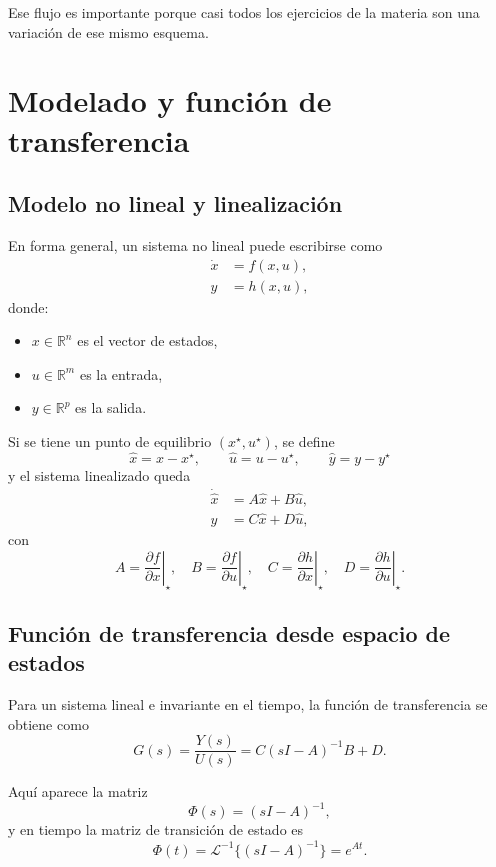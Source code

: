 \documentclass[11pt]{article}
\begin{document}
Ese flujo es importante porque casi todos los ejercicios de la materia son una variaci\'on de ese mismo esquema.

\section{Modelado y funci\'on de transferencia}
\subsection{Modelo no lineal y linealizaci\'on}
En forma general, un sistema no lineal puede escribirse como
\begin{align}
\dot{x} &= f(x,u),\\
y &= h(x,u),
\end{align}
donde:
\begin{itemize}
\item $x \in \mathbb{R}^n$ es el vector de estados,
\item $u \in \mathbb{R}^m$ es la entrada,
\item $y \in \mathbb{R}^p$ es la salida.
\end{itemize}

Si se tiene un punto de equilibrio $(x^\star,u^\star)$, se define
\[
\hat{x}=x-x^\star,\qquad \hat{u}=u-u^\star,\qquad \hat{y}=y-y^\star
\]
y el sistema linealizado queda
\begin{align}
\dot{\hat{x}} &= A\hat{x}+B\hat{u},\\
\hat{y} &= C\hat{x}+D\hat{u},
\end{align}
con
\[
A=\left.\frac{\partial f}{\partial x}\right|_\star,\quad
B=\left.\frac{\partial f}{\partial u}\right|_\star,\quad
C=\left.\frac{\partial h}{\partial x}\right|_\star,\quad
D=\left.\frac{\partial h}{\partial u}\right|_\star.
\]

\subsection{Funci\'on de transferencia desde espacio de estados}
Para un sistema lineal e invariante en el tiempo, la funci\'on de transferencia se obtiene como
\begin{equation}
G(s)=\frac{Y(s)}{U(s)}=C(sI-A)^{-1}B+D.
\end{equation}

Aqu\'i aparece la matriz
\[
\Phi(s)=(sI-A)^{-1},
\]
y en tiempo la matriz de transici\'on de estado es
\[
\Phi(t)=\mathcal{L}^{-1}\{(sI-A)^{-1}\}=e^{At}.
\]
\end{document}
